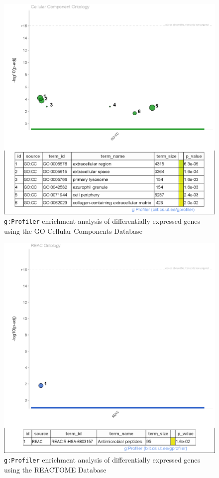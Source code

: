 \documentclass[pdflatex,sn-mathphys]{sn-jnl}%
\theoremstyle{thmstyleone}%
\theoremstyle{thmstyletwo}%
\theoremstyle{thmstylethree}%
\begin{document}
\begin{figure}[h]
    \centering
    \includegraphics[scale=0.45]{plots/assn2/cc_onto_plot.eps}
    \caption{\texttt{g:Profiler} enrichment analysis of differentially expressed genes using the GO Cellular Components Database}
    \label{fig:cc}
\end{figure}
\begin{figure}[h]
    \centering
    \includegraphics[scale=0.45]{plots/assn2/reac_onto_plot_special.eps}
    \caption{\texttt{g:Profiler} enrichment analysis of differentially expressed genes using the REACTOME Database}
    \label{fig:reac}
\end{figure}
\clearpage
\end{document}
